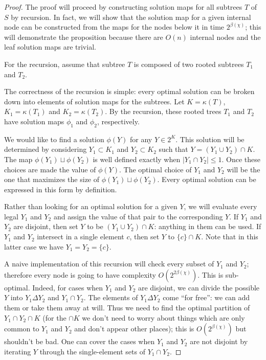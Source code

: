 \documentclass{amsart}
\newcommand{\col}{\chi}
\newcommand{\symmdiff}{\Delta}
\newcommand{\cut}{\kappa}
\newcommand{\bad}{\beta}
\begin{document}
\begin{proof}

The proof will proceed by constructing solution maps for all subtrees $T$ of $S$ by recursion.
In fact, we will show that the solution map for a given internal node can be constructed from the maps for the nodes below it in time $2^{\bad(\col)}$;
this will demonstrate the proposition because there are $O(n)$ internal nodes and the leaf solution maps are trivial.

For the recursion, assume that subtree $T$ is composed of two rooted subtrees $T_1$ and $T_2$.

The correctness of the recursion is simple: every optimal solution can be broken down into elements of solution maps for the subtrees.
Let $K = \cut(T)$, $K_1 = \cut(T_1)$ and $K_2 = \cut(T_2)$.
By the recursion, these rooted trees $T_1$ and $T_2$ have solution maps $\phi_1$ and $\phi_2$, respectively.

We would like to find a solution $\phi(Y)$ for any $Y \in 2^K$.
This solution will be determined by considering $Y_1 \subset K_1$ and $Y_2 \subset K_2$ such that $Y = (Y_1 \cup Y_2) \cap K$.
The map $\phi(Y_1) \sqcup \phi(Y_2)$ is well defined exactly when $|Y_1 \cap Y_2| \leq 1$.
Once these choices are made the value of $\phi(Y)$.
The optimal choice of $Y_1$ and $Y_2$ will be the one that maximizes the size of $\phi(Y_1) \sqcup \phi(Y_2)$.
Every optimal solution can be expressed in this form by definition.

Rather than looking for an optimal solution for a given $Y$, we will evaluate every legal $Y_1$ and $Y_2$ and assign the value of that pair to the corresponding $Y$.
If $Y_1$ and $Y_2$ are disjoint, then set $Y$ to be $(Y_1 \cup Y_2) \cap K$: anything in them can be used.
If $Y_1$ and $Y_2$ intersect in a single element $c$, then set $Y$ to $\{c\} \cap K$.
Note that in this latter case we have $Y_1 = Y_2 = \{c\}$.

A naive implementation of this recursion will check every subset of $Y_1$ and $Y_2$; therefore every node is going to have complexity $O(2^{2 \bad(\col)})$.
This is sub-optimal.
Indeed, for cases when $Y_1$ and $Y_2$ are disjoint, we can divide the possible $Y$ into $Y_1 \symmdiff Y_2$ and $Y_1 \cap Y_2$.
The elements of $Y_1 \symmdiff Y_2$ come ``for free'': we can add them or take them away at will.
Thus we need to find the optimal partition of $Y_1 \cap Y_2 \cap K$ (for the $\cap K$ we don't need to worry about things which are only common to $Y_1$ and $Y_2$ and don't appear other places); this is $O(2^{\bad(\col)})$ but shouldn't be bad.
One can cover the cases when $Y_1$ and $Y_2$ are not disjoint by iterating $Y$ through the single-element sets of $Y_1 \cap Y_2$.

\end{proof}
\end{document}
